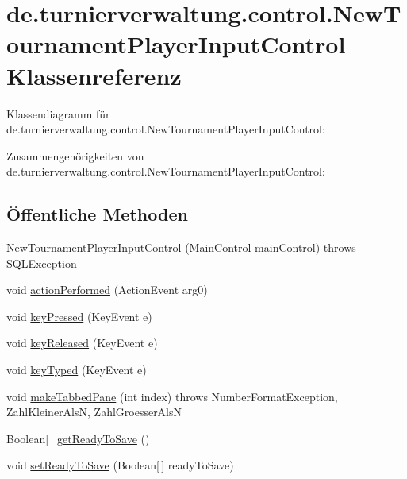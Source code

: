 \hypertarget{classde_1_1turnierverwaltung_1_1control_1_1_new_tournament_player_input_control}{}\section{de.\+turnierverwaltung.\+control.\+New\+Tournament\+Player\+Input\+Control Klassenreferenz}
\label{classde_1_1turnierverwaltung_1_1control_1_1_new_tournament_player_input_control}


Klassendiagramm für de.\+turnierverwaltung.\+control.\+New\+Tournament\+Player\+Input\+Control\+:


Zusammengehörigkeiten von de.\+turnierverwaltung.\+control.\+New\+Tournament\+Player\+Input\+Control\+:
\subsection*{Öffentliche Methoden}
\begin{DoxyCompactItemize}
\item 
\hyperlink{classde_1_1turnierverwaltung_1_1control_1_1_new_tournament_player_input_control_a8a265f4473c0b633bc97325892ded79d}{New\+Tournament\+Player\+Input\+Control} (\hyperlink{classde_1_1turnierverwaltung_1_1control_1_1_main_control}{Main\+Control} main\+Control)  throws S\+Q\+L\+Exception 
\item 
void \hyperlink{classde_1_1turnierverwaltung_1_1control_1_1_new_tournament_player_input_control_a56a6f361449861191025063448cd51d8}{action\+Performed} (Action\+Event arg0)
\item 
void \hyperlink{classde_1_1turnierverwaltung_1_1control_1_1_new_tournament_player_input_control_a94483fcb0a2932329a21349a7623d195}{key\+Pressed} (Key\+Event e)
\item 
void \hyperlink{classde_1_1turnierverwaltung_1_1control_1_1_new_tournament_player_input_control_af08d5ab37e5f7ff807eb0df18476d936}{key\+Released} (Key\+Event e)
\item 
void \hyperlink{classde_1_1turnierverwaltung_1_1control_1_1_new_tournament_player_input_control_a9da01b5a08a63124ea71d4d1715da231}{key\+Typed} (Key\+Event e)
\item 
void \hyperlink{classde_1_1turnierverwaltung_1_1control_1_1_new_tournament_player_input_control_a2cd45eb85cef613d5f90748583728476}{make\+Tabbed\+Pane} (int index)  throws Number\+Format\+Exception, Zahl\+Kleiner\+Als\+N, Zahl\+Groesser\+Als\+N 
\item 
Boolean\mbox{[}$\,$\mbox{]} \hyperlink{classde_1_1turnierverwaltung_1_1control_1_1_new_tournament_player_input_control_a7f6809211b5abf6800eef9cc843d796d}{get\+Ready\+To\+Save} ()
\item 
void \hyperlink{classde_1_1turnierverwaltung_1_1control_1_1_new_tournament_player_input_control_aeb9fad5a458263e7e390d2ec4878298e}{set\+Ready\+To\+Save} (Boolean\mbox{[}$\,$\mbox{]} ready\+To\+Save)
\end{DoxyCompactItemize}


